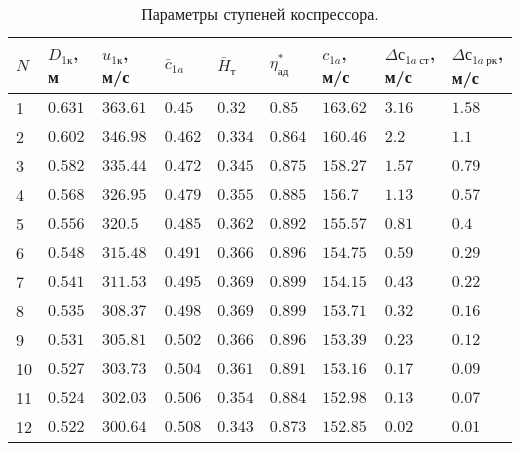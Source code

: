\documentclass[a4paper,10pt]{article}
\begin{document}
    \begin{longtable}{|p{0.7cm}|p{1.1cm}|p{1.1cm}|p{1.1cm}|p{1.1cm}|p{1.1cm}|p{1.1cm}|p{1.1cm}|p{1.1cm}|}
        \caption{Параметры ступеней коспрессора.}\\ \hline
        $N$ & $D_{1к}$, м & $u_{1к}$, м/с & $\bar{c}_{1a}$ & $\bar{H}_т$ & $\eta_{ад}^*$ &
        $c_{1a}$, м/с & $\Delta с_{1a\ ст}$, м/с & $\Delta с_{1a\ рк}$, м/с \\ \hline
%        
        1 & $0.631$ & $363.61$ &
        $0.45$ &
        $0.32$ & $0.85$ &
        $163.62$ & $3.16$ &
        $1.58$ \\ \hline
%        
        2 & $0.602$ & $346.98$ &
        $0.462$ &
        $0.334$ & $0.864$ &
        $160.46$ & $2.2$ &
        $1.1$ \\ \hline
%        
        3 & $0.582$ & $335.44$ &
        $0.472$ &
        $0.345$ & $0.875$ &
        $158.27$ & $1.57$ &
        $0.79$ \\ \hline
%        
        4 & $0.568$ & $326.95$ &
        $0.479$ &
        $0.355$ & $0.885$ &
        $156.7$ & $1.13$ &
        $0.57$ \\ \hline
%        
        5 & $0.556$ & $320.5$ &
        $0.485$ &
        $0.362$ & $0.892$ &
        $155.57$ & $0.81$ &
        $0.4$ \\ \hline
%        
        6 & $0.548$ & $315.48$ &
        $0.491$ &
        $0.366$ & $0.896$ &
        $154.75$ & $0.59$ &
        $0.29$ \\ \hline
%        
        7 & $0.541$ & $311.53$ &
        $0.495$ &
        $0.369$ & $0.899$ &
        $154.15$ & $0.43$ &
        $0.22$ \\ \hline
%        
        8 & $0.535$ & $308.37$ &
        $0.498$ &
        $0.369$ & $0.899$ &
        $153.71$ & $0.32$ &
        $0.16$ \\ \hline
%        
        9 & $0.531$ & $305.81$ &
        $0.502$ &
        $0.366$ & $0.896$ &
        $153.39$ & $0.23$ &
        $0.12$ \\ \hline
%        
        10 & $0.527$ & $303.73$ &
        $0.504$ &
        $0.361$ & $0.891$ &
        $153.16$ & $0.17$ &
        $0.09$ \\ \hline
%        
        11 & $0.524$ & $302.03$ &
        $0.506$ &
        $0.354$ & $0.884$ &
        $152.98$ & $0.13$ &
        $0.07$ \\ \hline
%        
        12 & $0.522$ & $300.64$ &
        $0.508$ &
        $0.343$ & $0.873$ &
        $152.85$ & $0.02$ &
        $0.01$ \\ \hline
%        
    \end{longtable}
\end{document}
